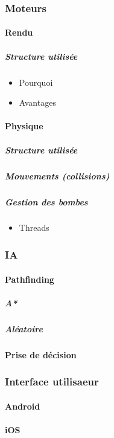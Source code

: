 	\subsubsection{Moteurs}
		\paragraph{Rendu}
			\subparagraph{Structure utilisée}
				\begin{itemize}
					\item{Pourquoi}
					\item{Avantages}
				\end{itemize}
		\paragraph{Physique}
			\subparagraph{Structure utilisée}
			\subparagraph{Mouvements (collisions)}
			\subparagraph{Gestion des bombes}
				\begin{itemize}
					\item{Threads}
				\end{itemize}
	
	\subsubsection{IA}
		\paragraph{Pathfinding}
			\subparagraph{A*}
			\subparagraph{Aléatoire}
			\paragraph{Prise de décision}
	
	\subsubsection{Interface utilisaeur}
		\paragraph{Android}
		\paragraph{iOS}